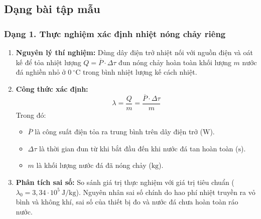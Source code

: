 

\subsection{Dạng bài tập mẫu}

\subsubsection{Dạng 1. Thực nghiệm xác định nhiệt nóng chảy riêng}
\begin{phuongphap}
\begin{enumerate}
\item \textbf{Nguyên lý thí nghiệm:} Dùng dây điện trở nhiệt nối với nguồn điện và oát kế để tỏa nhiệt lượng $Q = \overline{P} \cdot \Delta \tau$ đun nóng chảy hoàn toàn khối lượng $m$ nước đá nghiền nhỏ ở $0\ ^\circ\mathrm{C}$ trong bình nhiệt lượng kế cách nhiệt.
\item \textbf{Công thức xác định:}
\[
\lambda = \dfrac{Q}{m} = \dfrac{\overline{P} \cdot \Delta \tau}{m}
\]
Trong đó:
\begin{itemize}
    \item $\overline{P}$ là công suất điện tỏa ra trung bình trên dây điện trở ($\mathrm{W}$).
    \item $\Delta \tau$ là thời gian đun từ khi bắt đầu đến khi nước đá tan hoàn toàn ($\mathrm{s}$).
    \item $m$ là khối lượng nước đá đã nóng chảy ($\mathrm{kg}$).
\end{itemize}
\item \textbf{Phân tích sai số:} So sánh giá trị thực nghiệm với giá trị tiêu chuẩn ($\lambda_0 = 3{,}34 \cdot 10^5\ \mathrm{J/kg}$). Nguyên nhân sai số chính do hao phí nhiệt truyền ra vỏ bình và không khí, sai số của thiết bị đo và nước đá chưa hoàn toàn ráo nước.
\end{enumerate}
\end{phuongphap}

